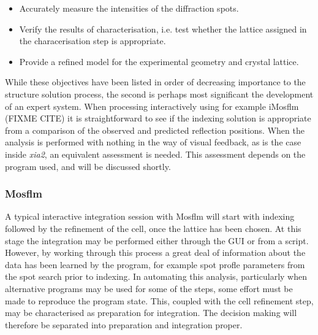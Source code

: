\documentclass[a4paper,11pt]{article}
\begin{document}
\begin{itemize}
\item{Accurately measure the intensities of the diffraction spots.}
\item{Verify the results of characterisation, i.e. test whether the
    lattice assigned in the characerisation step is appropriate.}
\item{Provide a refined model for the experimental geometry and
    crystal lattice.}
\end{itemize}

\noindent
While these objectives have been listed in order of decreasing
importance to the structure solution process, the second is perhaps
most significant the development of an expert system. When processing
interactively using for example iMosflm (FIXME CITE) it is
straightforward to see if the indexing solution is appropriate from a
comparison of the observed and predicted reflection positions. When
the analysis is performed with nothing in the way of visual feedback,
as is the case inside \emph{xia2}, an equivalent assessment is
needed. This assessment depends on the program used, and will be
discussed shortly.

\subsubsection{Mosflm}

A typical interactive integration session with Mosflm will start with
indexing followed by the refinement of the cell, once the lattice has
been chosen. At this stage the integration may be performed either
through the GUI or from a script. However, by working through this
process a great deal of information about the data has been learned by
the program, for example spot profle parameters from the spot search
prior to indexing. In automating this analysis, particularly when
alternative programs may be used for some of the steps, some effort
must be made to reproduce the program state. This, coupled with the
cell refinement step, may be characterised as preparation for
integration. The decision making will therefore be separated into
preparation and integration proper.
\end{document}
